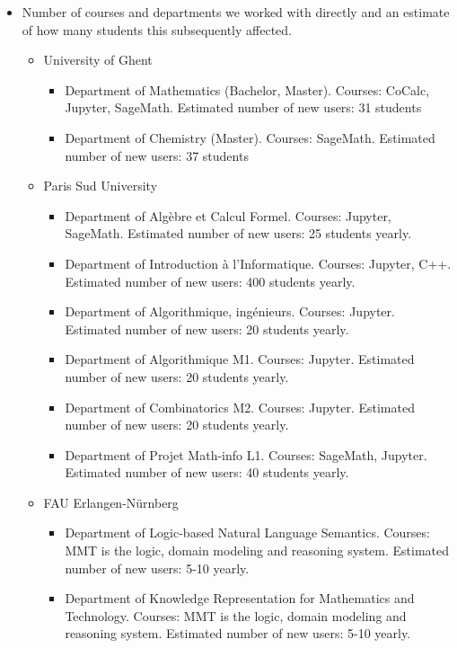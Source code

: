 \begin{enumerate}
\begin{itemize}
\item Number of courses and departments we worked with directly and an estimate of how many students this subsequently affected.

\begin{itemize}
  \item University of Ghent
  \begin{itemize}
  \item Department of Mathematics (Bachelor, Master). Courses: CoCalc, Jupyter, SageMath. Estimated number of new users: 31 students
  \item Department of Chemistry (Master). Courses: SageMath. Estimated number of new users: 37 students
   \end{itemize}
   
  \item Paris Sud University 
  \begin{itemize}
   \item Department of Algèbre et Calcul Formel. Courses: Jupyter, SageMath. Estimated number of new users: 25 students yearly.
   \item Department of Introduction à l'Informatique. Courses: Jupyter, C++. Estimated number of new users: 400 students yearly.
   \item Department of Algorithmique, ingénieurs. Courses: Jupyter. Estimated number of new users: 20 students yearly.
   \item Department of Algorithmique M1. Courses: Jupyter. Estimated number of new users: 20 students yearly.
   \item Department of Combinatorics M2. Courses: Jupyter. Estimated number of new users: 20 students yearly.
   \item Department of Projet Math-info L1. Courses: SageMath, Jupyter. Estimated number of new users: 40 students yearly.
     \end{itemize}
     
  \item FAU Erlangen-Nürnberg
    \begin{itemize}
   \item Department of Logic-based Natural Language Semantics. Courses: MMT is the logic, domain modeling and reasoning system. Estimated 
 number of new users: 5-10 yearly. 
   \item Department of Knowledge Representation for Mathematics and Technology. Courses: MMT is the logic, domain modeling and reasoning 
  system. Estimated number of new users: 5-10 yearly. 
 \end{itemize}
 

\end{itemize}
\end{itemize}
\end{enumerate}

